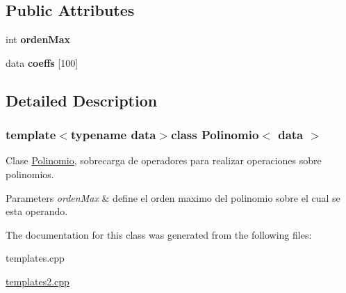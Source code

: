 \subsection*{Public Attributes}
\begin{DoxyCompactItemize}
\item 
\hypertarget{classPolinomio_a228fa52457b70b3738c29f1ceecc28f8}{int {\bfseries orden\-Max}}\label{classPolinomio_a228fa52457b70b3738c29f1ceecc28f8}

\item 
\hypertarget{classPolinomio_a6e299bea600b789550de4c822cb9588e}{data {\bfseries coeffs} \mbox{[}100\mbox{]}}\label{classPolinomio_a6e299bea600b789550de4c822cb9588e}

\end{DoxyCompactItemize}


\subsection{Detailed Description}
\subsubsection*{template$<$typename data$>$class Polinomio$<$ data $>$}

Clase \hyperlink{classPolinomio}{Polinomio}, sobrecarga de operadores para realizar operaciones sobre polinomios. 


\begin{DoxyParams}{Parameters}
{\em orden\-Max} & define el orden maximo del polinomio sobre el cual se esta operando. \\
\hline
\end{DoxyParams}


The documentation for this class was generated from the following files\-:\begin{DoxyCompactItemize}
\item 
templates.\-cpp\item 
\hyperlink{templates2_8cpp}{templates2.\-cpp}\end{DoxyCompactItemize}
